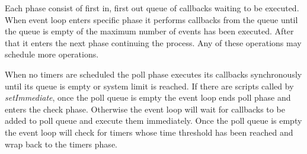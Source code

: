 Each phase consist of first in, first out queue of callbacks waiting to be executed.
When event loop enters specific phase it performs callbacks from the queue until the queue is empty of the maximum number of events has been executed.
After that it enters the next phase continuing the process.
Any of these operations may schedule more operations.

When no timers are scheduled the poll phase executes its callbacks synchronously until its queue is empty or system limit is reached.
If there are scripts called by \textit{setImmediate}, once the poll queue is empty the event loop ends poll phase and enters the check phase.
Otherwise the event loop will wait for callbacks to be added to poll queue and execute them immediately.
Once the poll queue is empty the event loop will check for timers whose time threshold has been reached and wrap back to the timers phase.
